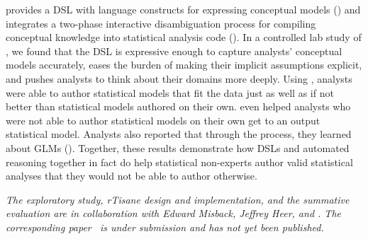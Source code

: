 \rTisane provides a DSL with language constructs for expressing conceptual
models (\thesisChallengeExplicit) and integrates a two-phase interactive
disambiguation process for compiling conceptual knowledge into statistical
analysis code (\thesisChallengeRep). In a controlled lab study of \rTisane, we
found that the DSL is expressive enough to capture analysts' conceptual models
accurately, eases the burden of making their implicit assumptions explicit, and
pushes analysts to think about their domains more deeply. Using \rTisane,
analysts were able to author statistical models that fit the data just as well
as if not better than statistical models authored on their own. \rTisane even
helped analysts who were not able to author statistical models on their own get
to an output statistical model. Analysts also reported that through the process,
they learned about GLMs (\thesisChallengeUnderstanding). Together, these results
demonstrate how DSLs and automated reasoning together in fact do help
statistical non-experts author valid statistical analyses that they would not be
able to author otherwise.






\textit{The exploratory study, rTisane design and implementation, and the
summative evaluation are in collaboration with Edward Misback, Jeffrey Heer, and
\reneJust. The corresponding paper~\cite{jun2023rTisane} is under submission and has not yet been
published.}
